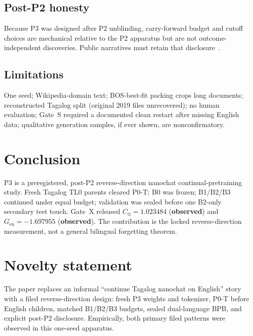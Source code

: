 \documentclass[11pt,a4paper]{article}
\begin{document}
\subsection{Post-P2 honesty}
Because P3 was designed after P2 unblinding, carry-forward budget and cutoff choices are mechanical relative to the P2 apparatus but are not outcome-independent discoveries. Public narratives must retain that disclosure~\cite{aspredicted307342}.

\subsection{Limitations}
One seed; Wikipedia-domain text; BOS-best-fit packing crops long documents; reconstructed Tagalog split (original 2019 files unrecovered); no human evaluation; Gate~S required a documented clean restart after missing English data; qualitative generation samples, if ever shown, are nonconfirmatory.

\section{Conclusion}
\label{sec:conclusion}

P3 is a preregistered, post-P2 reverse-direction nanochat continual-pretraining study. Fresh Tagalog TL0 parents cleared P0-T; B0 was frozen; B1/B2/B3 continued under equal budget; validation was sealed before one B2-only secondary test touch. Gate~X released $C_{\mathrm{tl}}=1.023484$ (\textbf{observed}) and $G_{\mathrm{en}}=-1.697955$ (\textbf{observed}). The contribution is the locked reverse-direction measurement, not a general bilingual forgetting theorem.

\section*{Novelty statement}
The paper replaces an informal ``continue Tagalog nanochat on English'' story with a filed reverse-direction design: fresh P3 weights and tokenizer, P0-T before English children, matched B1/B2/B3 budgets, sealed dual-language BPB, and explicit post-P2 disclosure. Empirically, both primary filed patterns were observed in this one-seed apparatus.
\end{document}
